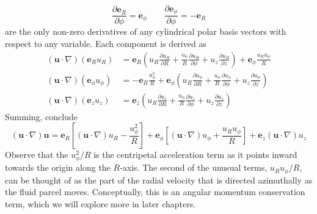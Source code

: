 \documentclass[a4paper]{article}
\begin{document}
\begin{enumerate}[label=(\alph*)]
	\[
		 \frac{\partial \pmb{e}_{R}}{\partial \phi} = \pmb{e}_{\phi} \qquad \frac{\partial \pmb{e}_{\phi}}{\partial \phi} = -\pmb{e}_{R}
	\]
	are the only non-zero derivatives of any cylindrical polar basis vectors with respect to any variable. Each component is derived as
	\begin{align*}
		\!\left( \pmb{u} \cdot \nabla \right)\!\left( \pmb{e}_{R}u_{R} \right) & = \pmb{e}_{R}\!\left(  u_{R}\frac{\partial u_{R}}{\partial R} + \frac{u_{\phi}}{R}\frac{\partial u_{R}}{\partial \phi} + u_{z}\frac{\partial u_{R}}{\partial z} \right) + \pmb{e}_{\phi}\frac{u_{R}u_{\phi}}{R} \\
		\!\left( \pmb{u} \cdot \nabla \right)\!\left( \pmb{e}_{\phi}u_{\phi} \right) & = -\pmb{e}_{R}\frac{u^{2}_{\phi}}{R} + \pmb{e}_{\phi}\!\left( u_{R}\frac{\partial u_{\phi}}{\partial R} + \frac{u_{\phi}}{R}\frac{\partial u_{\phi}}{\partial \phi} + u_{z}\frac{\partial u_{\phi}}{\partial z} \right) \\ 
		\!\left( \pmb{u} \cdot \nabla \right)\!\left( \pmb{e}_{z}u_{z} \right) & = \pmb{e}_{z}\!\left(  u_{R}\frac{\partial u_{z}}{\partial R} + \frac{u_{\phi}}{R}\frac{\partial u_{z}}{\partial \phi} + u_{z}\frac{\partial u_{z}}{\partial z} \right)
	\end{align*}
	Summing, conclude
	\[
		\!\left( \pmb{u} \cdot \nabla \right)\pmb{u} = \pmb{e}_{R}\!\left[ \!\left( \pmb{u} \cdot \nabla \right)u_{R} - \frac{u^{2}_{\phi}}{R} \right] + \pmb{e}_{\phi}\!\left[ \!\left( \pmb{u} \cdot \nabla \right)u_{\phi} + \frac{u_{R}u_{\phi}}{R} \right] + \pmb{e}_{z}\!\left( \pmb{u} \cdot \nabla \right)u_{z} 
	\]
	Observe that the \( u^{2}_{\phi} / R \) is the centripetal acceleration term as it points inward towards the origin along the \( R \)-axis. The second of the unusual terms, \( u_{R}u_{\phi} / R \), can be thought of as the part of the radial velocity that is directed azimuthally as the fluid parcel moves. Conceptually, this is an angular momentum conservation term, which we will explore more in later chapters.
\end{enumerate}
\end{document}
